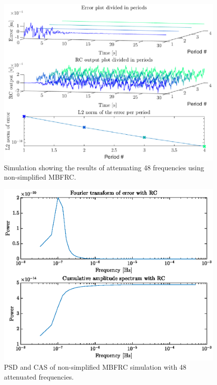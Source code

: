\documentclass[journal]{IEEEtran}
\begin{document}
\begin{figure}
    \centering
    \includegraphics[width=1\linewidth]{figures/nonSimple_RC_MBFRC/SimulationNonSimp48.eps}
    \caption{Simulation showing the results of attenuating 48 frequencies using non-simplified MBFRC.}
    \label{fig:nonSimpSim48}
\end{figure}
\begin{figure}
    \centering
    \includegraphics[width=1\linewidth]{figures/nonSimple_RC_MBFRC/FourierNonSimp48.eps}
    \caption{PSD and CAS of non-simplified MBFRC simulation with 48 attenuated frequencies.}
    \label{fig:fftNonSimp48}
\end{figure}
\end{document}
